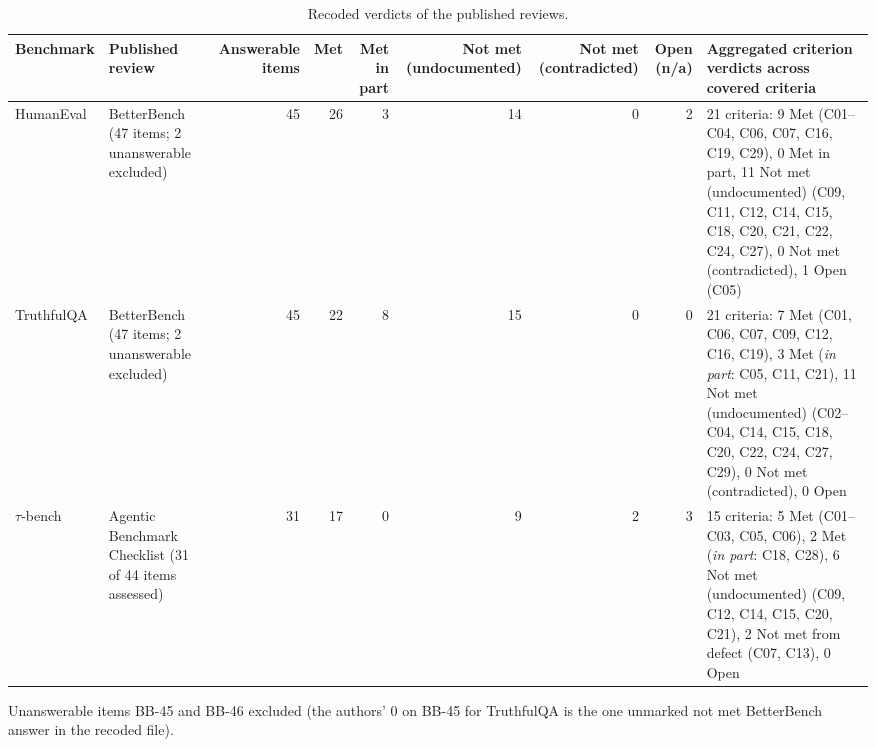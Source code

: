 \documentclass[10pt,conference]{IEEEtran}
\begin{document}
\begin{table}[t]
\caption{Recoded verdicts of the published reviews.}
\label{tab:earlier-reviews}
\centering
\small
\begin{tabularx}{\textwidth}{@{}llrrrrrrX@{}}
\toprule
\textbf{Benchmark} & \textbf{Published review} & \textbf{Answerable items} & \textbf{Met} & \textbf{Met in part} & \textbf{Not met (undocumented)} & \textbf{Not met (contradicted)} & \textbf{Open (n/a)} & \textbf{Aggregated criterion verdicts across covered criteria} \\
\midrule
HumanEval & BetterBench (47 items; 2 unanswerable excluded) & 45 & 26 & 3 & 14 & 0 & 2 & 21 criteria: 9 Met (C01--C04, C06, C07, C16, C19, C29), 0 Met in part, 11 Not met (undocumented) (C09, C11, C12, C14, C15, C18, C20, C21, C22, C24, C27), 0 Not met (contradicted), 1 Open (C05) \\
\midrule
TruthfulQA & BetterBench (47 items; 2 unanswerable excluded) & 45 & 22 & 8 & 15 & 0 & 0 & 21 criteria: 7 Met (C01, C06, C07, C09, C12, C16, C19), 3 Met (\emph{in part}: C05, C11, C21), 11 Not met (undocumented) (C02--C04, C14, C15, C18, C20, C22, C24, C27, C29), 0 Not met (contradicted), 0 Open \\
\midrule
$\tau$-bench & Agentic Benchmark Checklist (31 of 44 items assessed) & 31 & 17 & 0 & 9 & 2 & 3 & 15 criteria: 5 Met (C01--C03, C05, C06), 2 Met (\emph{in part}: C18, C28), 6 Not met (undocumented) (C09, C12, C14, C15, C20, C21), 2 Not met from defect (C07, C13), 0 Open \\
\bottomrule
\end{tabularx}
\par\vspace{2pt}\raggedright\footnotesize Unanswerable items BB-45 and BB-46 excluded (the authors' 0 on BB-45 for TruthfulQA is the one unmarked not met BetterBench answer in the recoded file).
\end{table}
\end{document}
